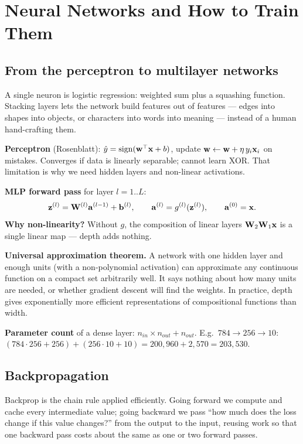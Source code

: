 \chapter{Neural Networks and How to Train Them}
\label{ch:nn}

\section{From the perceptron to multilayer networks}

\begin{intuition}
A single neuron is logistic regression: weighted sum plus a squashing function. Stacking layers lets the network build features out of features --- edges into shapes into objects, or characters into words into meaning --- instead of a human hand-crafting them.
\end{intuition}

\textbf{Perceptron} (Rosenblatt): $\hat y=\operatorname{sign}(\mathbf{w}^\top\mathbf{x}+b)$, update $\mathbf{w}\leftarrow\mathbf{w}+\eta\,y_i\mathbf{x}_i$ on mistakes. Converges if data is linearly separable; cannot learn XOR. That limitation is why we need hidden layers and non-linear activations.

\textbf{MLP forward pass} for layer $l=1..L$:
\[\mathbf{z}^{(l)}=\mathbf{W}^{(l)}\mathbf{a}^{(l-1)}+\mathbf{b}^{(l)},\qquad\mathbf{a}^{(l)}=g^{(l)}(\mathbf{z}^{(l)}),\qquad\mathbf{a}^{(0)}=\mathbf{x}.\]
\textbf{Why non-linearity?} Without $g$, the composition of linear layers $\mathbf{W}_2\mathbf{W}_1\mathbf{x}$ is a single linear map --- depth adds nothing.

\textbf{Universal approximation theorem.} A network with one hidden layer and enough units (with a non-polynomial activation) can approximate any continuous function on a compact set arbitrarily well. It says nothing about how many units are needed, or whether gradient descent will find the weights. In practice, depth gives exponentially more efficient representations of compositional functions than width.

\textbf{Parameter count} of a dense layer: $n_{in}\times n_{out}+n_{out}$. E.g.\ $784\to256\to10$: $(784\cdot256+256)+(256\cdot10+10)=200{,}960+2{,}570=203{,}530$.

\section{Backpropagation}

\begin{intuition}
Backprop is the chain rule applied efficiently. Going forward we compute and cache every intermediate value; going backward we pass ``how much does the loss change if this value changes?'' from the output to the input, reusing work so that one backward pass costs about the same as one or two forward passes.
\end{intuition}

